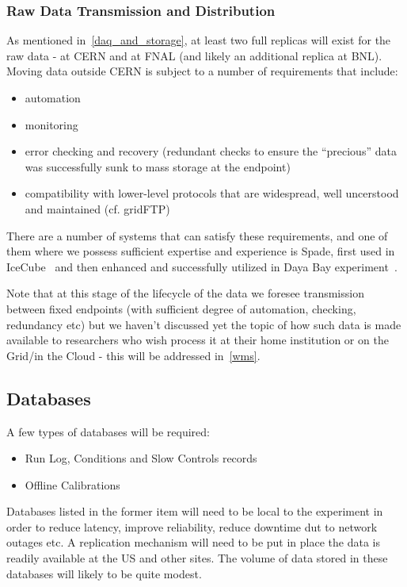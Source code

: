 \subsubsection{Raw Data Transmission and Distribution}
As mentioned in~\ref{daq_and_storage}, at least two full replicas will exist for the raw data - at CERN and at FNAL (and likely an additional replica at BNL). Moving data outside CERN
is subject to a number of requirements that include:
\begin{itemize}
\item automation
\item monitoring
\item error checking and recovery (redundant checks to ensure the ``precious'' data was successfully sunk to mass storage at the endpoint)
\item compatibility with lower-level protocols that are widespread, well uncerstood and maintained (cf. gridFTP)
\end{itemize}

There are a number of systems that can satisfy these requirements, and one of them where we possess sufficient expertise and experience is Spade, first used in IceCube~\cite{spade_icecube} and then enhanced and successfully utilized in Daya Bay experiment~\cite{spade_dayabay}.

Note that at this stage of the lifecycle of the data we foresee transmission between fixed endpoints (with sufficient degree of automation, checking, redundancy etc) but we haven't discussed yet the topic of how such
data is made available to researchers who wish process it at their home institution or on the Grid/in the Cloud - this will be addressed in~\ref{wms}.


\subsection{Databases}
A few types of databases will be required:
\begin{itemize}
\item Run Log, Conditions and Slow Controls records
\item Offline Calibrations
\end{itemize}

Databases listed in the former item will need to be local to the experiment in order to reduce latency, improve reliability, reduce downtime dut to
network outages etc.
A replication mechanism will need to be put in place the data is readily available at the US and other sites. The volume of data
stored in these databases will likely to be quite modest.

